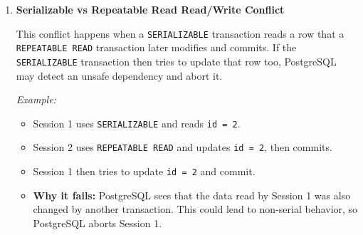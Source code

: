 \documentclass{article}
\begin{document}
\begin{enumerate}[label=\alph*)]
\begin{enumerate}
    \item \textbf{Serializable vs Repeatable Read Read/Write Conflict}

    This conflict happens when a \texttt{SERIALIZABLE} transaction reads a row that a \texttt{REPEATABLE READ} transaction later modifies and commits. If the \texttt{SERIALIZABLE} transaction then tries to update that row too, PostgreSQL may detect an unsafe dependency and abort it.

    \textit{Example:}
    \begin{itemize}
        \item Session 1 uses \texttt{SERIALIZABLE} and reads \texttt{id = 2}.
        \item Session 2 uses \texttt{REPEATABLE READ} and updates \texttt{id = 2}, then commits.
        \item Session 1 then tries to update \texttt{id = 2} and commit.
        \item \textbf{Why it fails:} PostgreSQL sees that the data read by Session 1 was also changed by another transaction. This could lead to non-serial behavior, so PostgreSQL aborts Session 1.
    \end{itemize}


        \end{enumerate}
    
    \end{enumerate}
\end{document}
